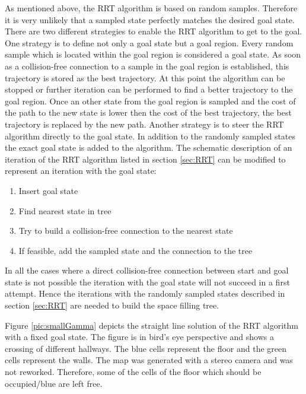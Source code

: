 As mentioned above, the RRT algorithm is based on random samples. Therefore it is very unlikely that a sampled state perfectly matches the desired goal state. \newline
There are two different strategies to enable the RRT algorithm to get to the goal. One strategy is to define not only a goal state but a goal region. Every random sample which is located within the goal region is considered a goal state. As soon as a collision-free connection to a sample in the goal region is established, this trajectory is stored as the best trajectory. At this point the algorithm can be stopped or further iteration can be performed to find a better trajectory to the goal region. Once an other state from the goal region is sampled and the cost of the path to the new state is lower then the cost of the best trajectory, the best trajectory is replaced by the new path. \newline
Another strategy is to steer the RRT algorithm directly to the goal state. In addition to the randomly sampled states the exact goal state is added to the algorithm. The schematic description of an iteration of the RRT algorithm listed in section \ref{sec:RRT} can be modified to represent an iteration with the goal state:

\begin{enumerate}
  \item Insert goal state
  \item Find nearest state in tree
  \item Try to build a collision-free connection to the nearest state
  \item If feasible, add the sampled state and the connection to the tree
\end{enumerate}

In all the cases where a direct collision-free connection between start and goal state is not possible the iteration with the goal state will not succeed in a first attempt. Hence the iterations with the randomly sampled states described in section \ref{sec:RRT} are needed to build the space filling tree.\newline

Figure \ref{pic:smallGamma} depicts the straight line solution of the RRT algorithm with a fixed goal state. The figure is in bird's eye perspective and shows a crossing of different hallways. The blue cells represent the floor and the green cells represent the walls. The map was generated with a stereo camera and was not reworked. Therefore, some of the cells of the floor which should be occupied/blue are left free. 

